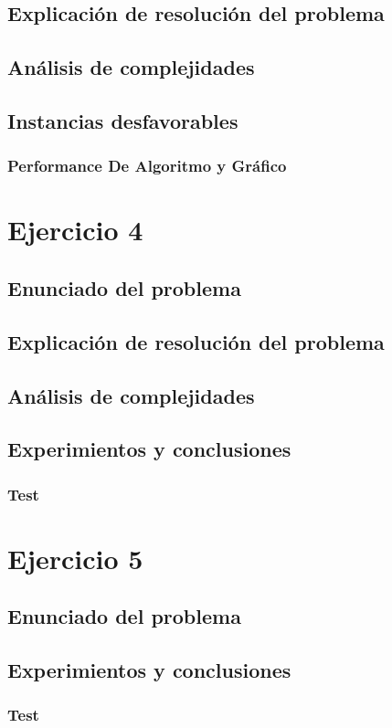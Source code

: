 \documentclass[12pt, a4paper]{article}
\begin{document}
\subsection{Explicaci\'on de resoluci\'on del problema}

%
\subsection{An\'alisis de complejidades}

\subsection{Instancias desfavorables}

\subsubsection[3.5]{Performance De Algoritmo y Gr\'afico}


\newpage
\section{Ejercicio 4} 
\subsection{Enunciado del problema}

\subsection{Explicaci\'on de resoluci\'on del problema}

\subsection{An\'alisis de complejidades}

\subsection{Experimientos y conclusiones}
\subsubsection[3.5]{Test}


\newpage
\section{Ejercicio 5} 
\subsection{Enunciado del problema}

\subsection{Experimientos y conclusiones}
\subsubsection[2.5]{Test}

\end{document}
